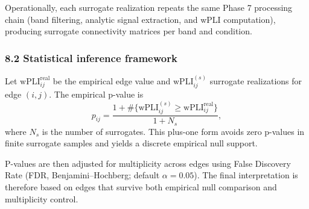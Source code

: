 Operationally, each surrogate realization repeats the same Phase 7 processing chain (band filtering, analytic signal extraction, and wPLI computation), producing surrogate connectivity matrices per band and condition.

\subsubsection{8.2 Statistical inference framework}
Let $\mathrm{wPLI}^{\mathrm{real}}_{ij}$ be the empirical edge value and $\mathrm{wPLI}^{(s)}_{ij}$ surrogate realizations for edge $(i,j)$. The empirical p-value is
\[
p_{ij}
=
\frac{1+\#\{\mathrm{wPLI}^{(s)}_{ij}\ge\mathrm{wPLI}^{\mathrm{real}}_{ij}\}}
{1+N_s},
\]
where $N_s$ is the number of surrogates. This plus-one form avoids zero p-values in finite surrogate samples and yields a discrete empirical null support.

P-values are then adjusted for multiplicity across edges using False Discovery Rate (FDR, Benjamini--Hochberg; default $\alpha=0.05$). The final interpretation is therefore based on edges that survive both empirical null comparison and multiplicity control.
